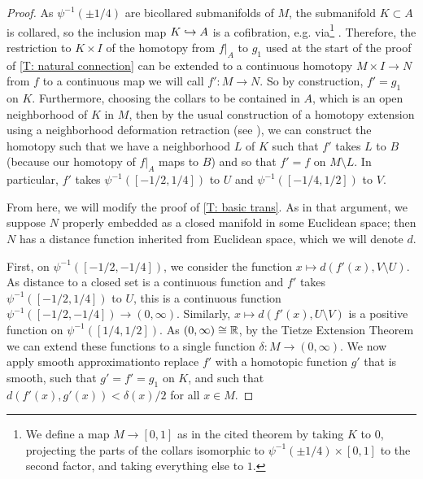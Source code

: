 \begin{proof}
	As $\psi^{-1}(\pm 1/4)$ are bicollared submanifolds of $M$, the submanifold $K \subset A$ is collared, so the inclusion map $K \hookrightarrow A$ is a cofibration, e.g. via\footnote{We define a map $M \to [0,1]$ as in the cited theorem by taking $K$ to $0$, projecting the parts of the collars isomorphic to $\psi^{-1}(\pm 1/4) \times [0,1]$ to the second factor, and taking everything else to $1$.} \cite[Theorem VII.1.5]{Bred97}.
	Therefore, the restriction to $K \times I$ of the homotopy from $f|_A$ to $g_1$ used at the start of the proof of \cref{T: natural connection} can be extended to a continuous homotopy $M \times I \to N$ from $f$ to a continuous map we will call $f' \colon M \to N$.
	So by construction, $f' = g_1$ on $K$.
	Furthermore, choosing the collars to be contained in $A$, which is an open neighborhood of $K$ in $M$, then by the usual construction of a homotopy extension using a neighborhood deformation retraction (see \cite[Section VII.1]{Bred97}), we can construct the homotopy such that we have a neighborhood $L$ of $K$ such that $f'$ takes $L$ to $B$ (because our homotopy of $f|_A$ maps to $B$) and so that $f' = f$ on $M \setminus L$.
	In particular, $f'$ takes $\psi^{-1}([-1/2,1/4])$ to $U$ and $\psi^{-1}([-1/4,1/2])$ to $V$.

	From here, we will modify the proof of \cref{T: basic trans}.
	As in that argument, we suppose $N$ properly embedded as a closed manifold in some Euclidean space; then $N$ has a distance function inherited from Euclidean space, which we will denote $d$.

	First, on $\psi^{-1}([-1/2,-1/4])$, we consider the function $x \mapsto d(f'(x), V \setminus U)$.
	As distance to a closed set is a continuous function and $f'$ takes $\psi^{-1}([-1/2,1/4])$ to $U$, this is a continuous function $\psi^{-1}([-1/2,-1/4]) \to (0,\infty)$.
	Similarly, $x \mapsto d(f'(x), U \setminus V)$ is a positive function on $\psi^{-1}([1/4, 1/2])$.
	As $(0,\infty) \cong \mathbb{R}$, by the Tietze Extension Theorem we can extend these functions to a single function $\delta \colon M \to (0, \infty)$.
	We now apply smooth approximation\footnotemark to replace $f'$ with a homotopic function $g'$ that is smooth, such that $g' = f' = g_1$ on $K$, and such that $d(f'(x),g'(x))<\delta(x)/2$ for all $x \in M$.


\end{proof}
